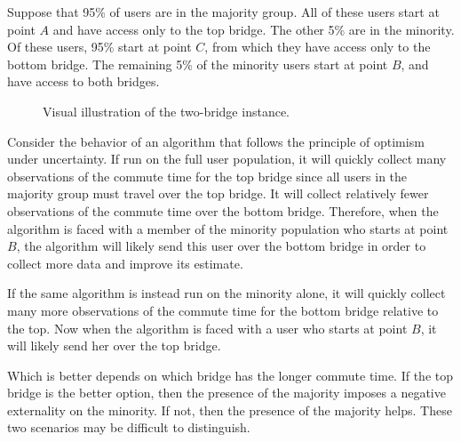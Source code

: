 Suppose that 95\% of users are in the majority group. All of these
users start at point $A$ and have access only to the top bridge. The
other 5\% are in the minority. Of these users, 95\% start at point
$C$, from which they have access only to the bottom bridge. The
remaining 5\% of the minority users start at point $B$, and have
access to both bridges.

\begin{figure}
\centering
{}
\caption{Visual illustration of the two-bridge instance. \label{fig:bridges}}
\end{figure}

Consider the behavior of an algorithm that follows the principle of
optimism under uncertainty.  If run on the full user population, it
will quickly collect many observations of the commute time for the top
bridge since all users in the majority group must travel over the top
bridge.  It will collect relatively fewer observations of the commute
time over the bottom bridge.  Therefore, when the algorithm is faced
with a member of the minority population who starts at point $B$, the
algorithm will likely send this user over the bottom bridge in order
to collect more data and improve its estimate. 

If the same algorithm is instead run on the minority alone, it will
quickly collect many more observations of the commute time for the
bottom bridge relative to the top.
Now when the algorithm is faced with a user who starts
at point $B$, it will likely send her over the top bridge.

Which is better depends on which bridge has the longer commute time.
If the top bridge is the better option, then the presence of the
majority imposes a negative externality on the minority. If not, then
the presence of the majority helps. These two scenarios may be
difficult to distinguish.

